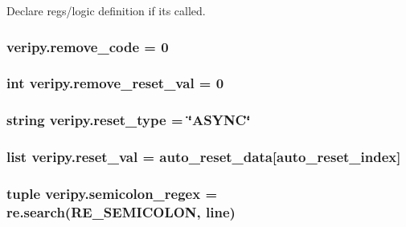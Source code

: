 Declare regs/logic definition if its called. 

\hypertarget{namespaceveripy_af1eba550ad186f9ce48ced0faa2b8cf7}{
\subsubsection[{remove\-\_\-code}]{\setlength{\rightskip}{0pt plus 5cm}veripy.\-remove\-\_\-code = 0}}\label{namespaceveripy_af1eba550ad186f9ce48ced0faa2b8cf7}
\hypertarget{namespaceveripy_ab3ef77cc1c1bb3b758841e9926029532}{
\subsubsection[{remove\-\_\-reset\-\_\-val}]{\setlength{\rightskip}{0pt plus 5cm}int veripy.\-remove\-\_\-reset\-\_\-val = 0}}\label{namespaceveripy_ab3ef77cc1c1bb3b758841e9926029532}
\hypertarget{namespaceveripy_abd4a1cb335c94ddd87dca9c75dacce37}{
\subsubsection[{reset\-\_\-type}]{\setlength{\rightskip}{0pt plus 5cm}string veripy.\-reset\-\_\-type = \char`\"{}A\-S\-Y\-N\-C\char`\"{}}}\label{namespaceveripy_abd4a1cb335c94ddd87dca9c75dacce37}
\hypertarget{namespaceveripy_a0b2d8a820c3d794138a0f30fe95f2617}{
\subsubsection[{reset\-\_\-val}]{\setlength{\rightskip}{0pt plus 5cm}list veripy.\-reset\-\_\-val = {\bf auto\-\_\-reset\-\_\-data}\mbox{[}{\bf auto\-\_\-reset\-\_\-index}\mbox{]}}}\label{namespaceveripy_a0b2d8a820c3d794138a0f30fe95f2617}
\hypertarget{namespaceveripy_a20dab80a7e8e079a2d6d78c4dc51b972}{
\subsubsection[{semicolon\-\_\-regex}]{\setlength{\rightskip}{0pt plus 5cm}tuple veripy.\-semicolon\-\_\-regex = re.\-search(R\-E\-\_\-\-S\-E\-M\-I\-C\-O\-L\-O\-N, {\bf line})}}\label{namespaceveripy_a20dab80a7e8e079a2d6d78c4dc51b972}
